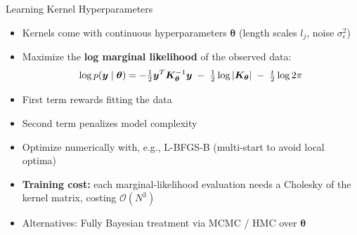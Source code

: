 \documentclass[main]{subfiles}
\begin{document}
\begin{frame}[t]{Learning Kernel Hyperparameters}
  \begin{itemize}
   \item Kernels come with continuous hyperparameters $\bm{\theta}$ (length scales $l_j$, noise $\sigma^2_\epsilon$)
  \item Maximize the \textbf{log marginal likelihood} of the observed data:
  $$
  \log p(\bm{y} \mid \bm{\theta}) = -\tfrac{1}{2} \bm{y}^T \bm{K}_{\bm{\theta}}^{-1} \bm{y}
    \;-\; \tfrac{1}{2} \log |\bm{K}_{\bm{\theta}}|
    \;-\; \tfrac{t}{2} \log 2\pi
  $$
    \item First term rewards fitting the data
    \item Second term penalizes model complexity
    \item Optimize numerically with, e.g., L-BFGS-B (multi-start to avoid local optima)
    \item \textbf{Training cost:} each marginal-likelihood evaluation needs a Cholesky of the kernel matrix, costing $\mathcal{O}(N^3)$
    \item Alternatives: Fully Bayesian treatment via MCMC / HMC over $\bm{\theta}$
\end{itemize}
\end{frame}
\end{document}
